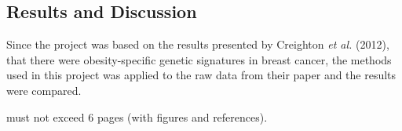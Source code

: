 \documentclass[12pt, a4paper]{article}
\begin{document}
\newpage

\subsection*{Results and Discussion}

Since the project was based on the results presented by Creighton \textit{et al.} (2012), that there were obesity-specific genetic signatures in breast cancer, the methods used in this project was applied to the raw data from their paper and the results were compared.


must not exceed 6 pages (with figures and references).


%
%
\end{document}
